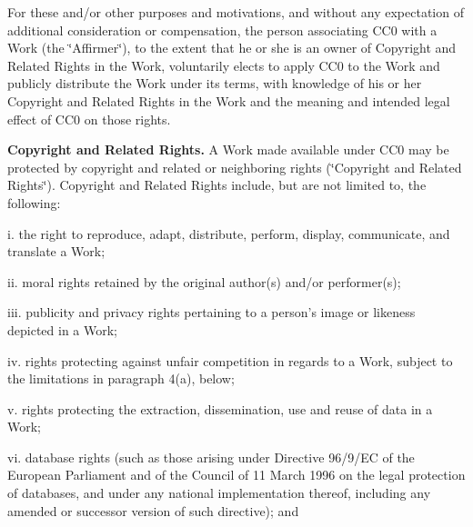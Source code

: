 For these and/or other purposes and motivations, and without any expectation of additional consideration or compensation, the person associating C\+C0 with a Work (the \char`\"{}\+Affirmer\char`\"{}), to the extent that he or she is an owner of Copyright and Related Rights in the Work, voluntarily elects to apply C\+C0 to the Work and publicly distribute the Work under its terms, with knowledge of his or her Copyright and Related Rights in the Work and the meaning and intended legal effect of C\+C0 on those rights.


\begin{DoxyEnumerate}
\item {\bfseries Copyright and Related Rights.} A Work made available under C\+C0 may be protected by copyright and related or neighboring rights (\char`\"{}\+Copyright and Related Rights\char`\"{}). Copyright and Related Rights include, but are not limited to, the following\+:

i. the right to reproduce, adapt, distribute, perform, display, communicate, and translate a Work;

ii. moral rights retained by the original author(s) and/or performer(s);

iii. publicity and privacy rights pertaining to a person's image or likeness depicted in a Work;

iv. rights protecting against unfair competition in regards to a Work, subject to the limitations in paragraph 4(a), below;

v. rights protecting the extraction, dissemination, use and reuse of data in a Work;

vi. database rights (such as those arising under Directive 96/9/\+E\+C of the European Parliament and of the Council of 11 March 1996 on the legal protection of databases, and under any national implementation thereof, including any amended or successor version of such directive); and


\end{DoxyEnumerate}
